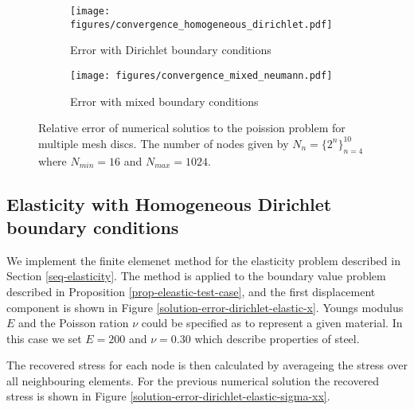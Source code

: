 \documentclass[5pt,a4paper,english]{elsarticle}%
\begin{document}
\begin{figure}[t]
\begin{subfigure}[t]{0.5\linewidth}
        \centering
            \texttt{[image: figures/convergence\_homogeneous\_dirichlet.pdf]}
        \caption{Error with Dirichlet boundary conditions}
        \label{convergence-dirichlet}
    \end{subfigure}\qquad
    \begin{subfigure}[t]{0.5\linewidth}
        \centering
            \texttt{[image: figures/convergence\_mixed\_neumann.pdf]}
        \caption{Error with mixed boundary conditions}
        \label{convergence-neumann}
    \end{subfigure}
    \label{fig-convergence}
    \caption{Relative error of numerical solutios to the poission problem for multiple mesh discs. The number of nodes given by $N_n = \{ 2^n\}_{n=4}^{10}$
    where $N_{min} = 16$ and $N_{max} = 1024$.}
\end{figure}


\subsection{Elasticity with Homogeneous Dirichlet boundary conditions}
We implement the finite elemenet method for the elasticity problem described in Section \ref{seq-elasticity}. The method is applied to the boundary value problem described in Proposition \eqref{prop-eleastic-test-case}, and the first displacement component is shown in Figure \ref{solution-error-dirichlet-elastic-x}. Youngs modulus $E$ and the Poisson ration $\nu$ could be specified as to represent a given material. In this case we set $E = 200$ and $\nu = 0.30$ which describe properties of steel. 

The recovered stress for each node is then calculated by averageing the stress over all neighbouring elements. For the previous numerical solution the recovered stress is shown in Figure \ref{solution-error-dirichlet-elastic-sigma-xx}. 
\end{document}
